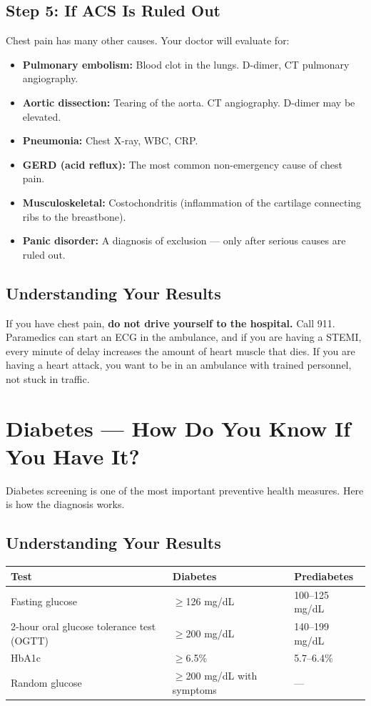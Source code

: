 \subsection{Step 5: If ACS Is Ruled Out}

Chest pain has many other causes. Your doctor will evaluate for:
\begin{itemize}
    \item \textbf{Pulmonary embolism:} Blood clot in the lungs. D-dimer, CT pulmonary angiography.
    \item \textbf{Aortic dissection:} Tearing of the aorta. CT angiography. D-dimer may be elevated.
    \item \textbf{Pneumonia:} Chest X-ray, WBC, CRP.
    \item \textbf{GERD (acid reflux):} The most common non-emergency cause of chest pain.
    \item \textbf{Musculoskeletal:} Costochondritis (inflammation of the cartilage connecting ribs to the breastbone).
    \item \textbf{Panic disorder:} A diagnosis of exclusion --- only after serious causes are ruled out.
\end{itemize}

\subsection{Understanding Your Results}

If you have chest pain, \textbf{do not drive yourself to the hospital.} Call 911. Paramedics can start an ECG in the ambulance, and if you are having a STEMI, every minute of delay increases the amount of heart muscle that dies. If you are having a heart attack, you want to be in an ambulance with trained personnel, not stuck in traffic.

\clearpage
\section{Diabetes --- How Do You Know If You Have It?}

Diabetes screening is one of the most important preventive health measures. Here is how the diagnosis works.

\subsection{Understanding Your Results}

\begin{longtable}{@{}lll@{}}
\toprule
\textbf{Test} & \textbf{Diabetes} & \textbf{Prediabetes} \\
\midrule
Fasting glucose & $\geq$126 mg/dL & 100--125 mg/dL \\
2-hour oral glucose tolerance test (OGTT) & $\geq$200 mg/dL & 140--199 mg/dL \\
HbA1c & $\geq$6.5\% & 5.7--6.4\% \\
Random glucose & $\geq$200 mg/dL with symptoms & --- \\
\bottomrule
\end{longtable}

